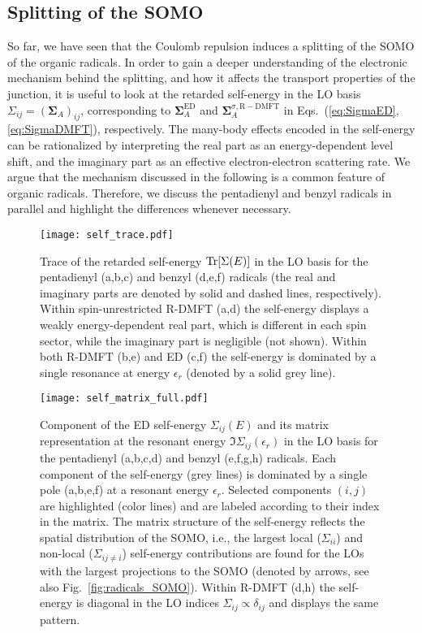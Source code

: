 \documentclass[aps,prx,twocolumn,superscriptaddress]{revtex4-2}
\begin{document}
\subsection{Splitting of the SOMO}
So far, we have seen that the Coulomb repulsion induces a splitting of the SOMO of the organic radicals. 
In order to gain a deeper understanding of the electronic mechanism behind the splitting, 
and how it affects the transport properties of the junction, 
it is useful to look at the retarded self-energy in the LO basis $\Sigma_{ij} = (\mathbf{\Sigma}_A)_{ij}$, 
corresponding to $\mathbf{\Sigma}_A^{\mathrm{ED}}$ and $\mathbf{\Sigma}_A^{\sigma,\mathrm{R-DMFT}}$ 
in Eqs.~(\ref{eq:SigmaED}, \ref{eq:SigmaDMFT}), respectively. 
The many-body effects encoded in the self-energy can be rationalized by interpreting 
the real part as an energy-dependent level shift,  
and the imaginary part as an effective electron-electron scattering rate. 
We argue that the mechanism discussed in the following is a common feature of organic radicals. 
Therefore, we discuss the pentadienyl and benzyl radicals in parallel 
and highlight the differences whenever necessary. 


\begin{figure}[htp]
\texttt{[image: self\_trace.pdf]}
\caption{Trace of the retarded self-energy $\Tr[\Sigma(E)]$ in the LO basis 
for the pentadienyl (a,b,c) and benzyl (d,e,f) radicals 
(the real and imaginary parts are denoted by solid and dashed lines, respectively). 
Within spin-unrestricted R-DMFT (a,d) the self-energy displays a weakly energy-dependent real part, 
which is different in each spin sector, while the imaginary part is negligible (not shown). 
Within both R-DMFT (b,e) and ED (c,f) the self-energy is dominated by a single resonance at energy $\epsilon_r$ 
(denoted by a solid grey line). }
\label{fig:self_trace}  
\end{figure}

\begin{figure*}[tp]
\texttt{[image: self\_matrix\_full.pdf]}
\caption{Component of the ED self-energy $\Sigma_{ij}(E)$ and its matrix representation 
at the resonant energy $\Im\Sigma_{ij}(\epsilon_r)$ in the LO basis 
for the pentadienyl (a,b,c,d) and benzyl (e,f,g,h) radicals. 
Each component of the self-energy (grey lines) is dominated by a single pole (a,b,e,f) at a resonant energy $\epsilon_r$. 
Selected components $(i,j)$ are highlighted (color lines) and are labeled according to their index in the matrix. 
The matrix structure of the self-energy reflects the spatial distribution of the SOMO, 
i.e., the largest local ($\Sigma_{ii}$) and non-local ($\Sigma_{ij\neq i}$) self-energy contributions 
are found for the LOs with the largest projections to the SOMO 
(denoted by arrows, see also Fig.~\ref{fig:radicals_SOMO}). 
Within R-DMFT (d,h) the self-energy is diagonal in the LO indices $\Sigma_{ij}\propto\delta_{ij}$ and displays the same pattern. }
\label{fig:self_matrix}  
\end{figure*}
\end{document}
